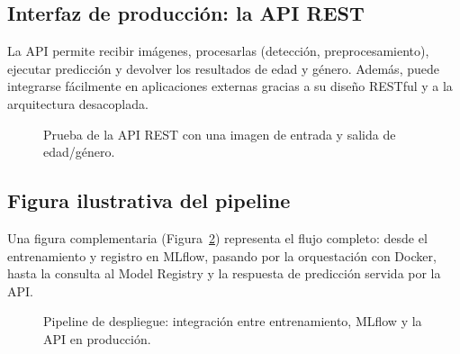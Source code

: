 \subsection{Interfaz de producción: la API REST}
La API permite recibir imágenes, procesarlas (detección, preprocesamiento), ejecutar predicción y devolver los resultados de edad y género. 
Además, puede integrarse fácilmente en aplicaciones externas gracias a su diseño RESTful y a la arquitectura desacoplada.

\begin{figure}[h]
\centering
\caption{Prueba de la API REST con una imagen de entrada y salida de edad/género.}
\label{fig:api-frontend}
\end{figure}

\subsection{Figura ilustrativa del pipeline}
Una figura complementaria (Figura~\ref{fig:deployment-architecture}) representa el flujo completo: 
desde el entrenamiento y registro en MLflow, pasando por la orquestación con Docker, hasta la consulta al Model Registry y la respuesta de predicción servida por la API.

\begin{figure}[h]
\centering
\caption{Pipeline de despliegue: integración entre entrenamiento, MLflow y la API en producción.}
\label{fig:deployment-architecture}
\end{figure}
